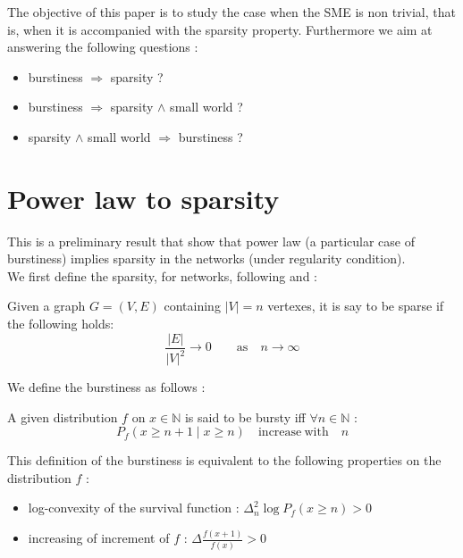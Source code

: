 \documentclass{article}
\begin{document}
The objective of this paper is to study the case when the SME is non trivial, that is, when it is accompanied with the sparsity property. Furthermore we aim at answering the following questions :
\begin{itemize}
    \item burstiness $\Rightarrow$ sparsity ?
    \item burstiness $\Rightarrow$ sparsity  $\wedge$ small world ?
    \item sparsity  $\wedge$ small world $\Rightarrow$ burstiness ?
\end{itemize}

\section{Power law to sparsity}
This is a preliminary result that show that power law (a particular case of burstiness) implies sparsity in the networks (under regularity condition).~\\

We first define the sparsity, for networks, following \cite{orbanz2015bayesian} and \cite{veitch2015class} :
\begin{definition}[Sparsity]
    Given a graph $G = (V,E)$ containing $|V|=n$ vertexes, it is say to be sparse if the following holds:
    \begin{equation}
        \frac{|E|}{|V|^2} \rightarrow 0 \qquad \mathrm{as} \quad  n \rightarrow \infty
    \end{equation}
\end{definition}


We define the burstiness as follows :
\begin{definition}[Burstiness]
    A given distribution $f$ on $x \in \mathbb{N}$ is said to be bursty iff $\forall n \in \mathbb{N} $ :
    \begin{equation}
        P_f(x \geq n+1 \mid x \geq n) \quad  \mathrm{increase\ with} \quad n
    \end{equation}
\end{definition}

This definition of the burstiness is equivalent to the following properties on the distribution $f$ :
\begin{itemize}
    \item log-convexity of the survival function : $\Delta_n^2 \log P_f(x \geq n) > 0$
    \item increasing of increment of $f$ : $\Delta \frac{f(x+1)}{f(x)} > 0$
\end{itemize}
\end{document}

